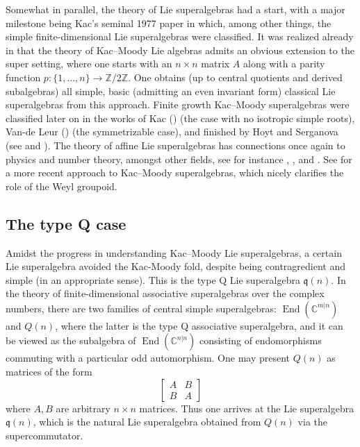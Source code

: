 \documentclass[12pt, a4paper, reqno]{amsart}
\def\C{\mathbb{C}}
\def\Z{\mathbb{Z}}
\def\q{\mathfrak{q}}
\theoremstyle{definition}
\theoremstyle{definition}
\theoremstyle{definition}
\numberwithin{theorem}{section}
\numberwithin{lemma}{section}
\numberwithin{remark}{section}
\numberwithin{definition}{section}
\numberwithin{corollary}{section}
\numberwithin{proposition}{section}
\numberwithin{example}{section}
\begin{document}
	Somewhat in parallel, the theory of Lie superalgebras had a start, with a major milestone being Kac's seminal 1977 paper \cite{K2} in which, among other things, the simple finite-dimensional Lie superalgebras were classified.  It was realized already in \cite{K2} that the theory of Kac--Moody Lie algebras admits an obvious extension to the super setting, where one starts with an $n\times n$ matrix $A$ along with a parity function $p:\{1,\dots,n\}\to\Z/2\Z$.  One obtains (up to central quotients and derived subalgebras) all simple, basic (admitting an even invariant form) classical Lie superalgebras from this approach.  Finite growth Kac--Moody superalgebras were classified later on in the works of Kac (\cite{K4}) (the case with no isotropic simple roots), Van-de Leur (\cite{L}) (the symmetrizable case), and finished by Hoyt and Serganova (see \cite{C} and \cite{CS}).  The theory of affine Lie superalgebras has connections once again to physics and number theory, amongst other fields, see for instance \cite{KW1}, \cite{KW2}, and \cite{KW3}.   See \cite{GHS} for a more recent approach to Kac--Moody superalgebras, which nicely clarifies the role of the Weyl groupoid.
	
	\subsection{The type Q case} Amidst the progress in understanding Kac--Moody Lie superalgebras, a certain Lie superalgebra avoided the Kac-Moody fold, despite being contragredient and simple (in an appropriate sense).  This is the type Q Lie superalgebra $\q(n)$.  In the theory of finite-dimensional associative superalgebras over the complex numbers, there are two families of central simple superalgebras: $\operatorname{End}(\C^{m|n})$ and $Q(n)$, where the latter is the type Q associative superalgebra, and it can be viewed as the subalgebra of $\operatorname{End}(\C^{n|n})$ consisting of endomorphisms commuting with a particular odd automorphism.  One may present $Q(n)$ as matrices of the form
	\[
	\begin{bmatrix}
		A & B\\ B & A
	\end{bmatrix}
	\]
	where $A,B$ are arbitrary $n\times n$ matrices.  Thus one arrives at the Lie superalgebra $\q(n)$, which is the natural Lie superalgebra obtained from $Q(n)$ via the supercommutator.  
	
\end{document}
